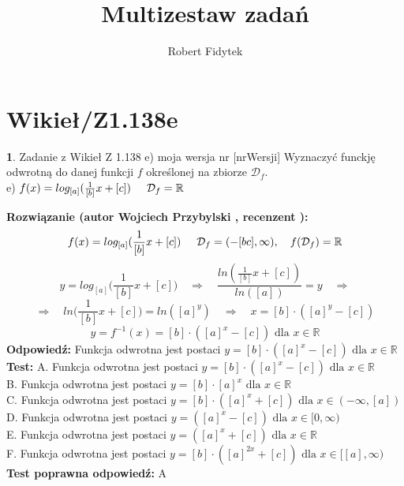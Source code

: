 \documentclass[12pt, a4paper]{article}
\title{Multizestaw zadań}
\author{Robert Fidytek}
\date{}
\theoremstyle{definition} %
\newtheorem{zad}{}
\newcommand{\kategoria}[1]{\section{#1}} %
\newcommand{\zadStart}[1]{\begin{zad}#1\newline} %
\newcommand{\zadStop}{\end{zad}}   %
\newcommand{\rozwStart}[2]{\noindent \textbf{Rozwiązanie (autor #1 , recenzent #2): }\newline} %
\newcommand{\rozwStop}{\newline}                                            %
\newcommand{\odpStart}{\noindent \textbf{Odpowiedź:}\newline}    %
\newcommand{\odpStop}{\newline}                                             %
\newcommand{\testStart}{\noindent \textbf{Test:}\newline} %
\newcommand{\testStop}{\newline} %
\newcommand{\kluczStart}{\noindent \textbf{Test poprawna odpowiedź:}\newline} %
\newcommand{\kluczStop}{\newline} %
\begin{document}
\maketitle


\kategoria{Wikieł/Z1.138e}
\zadStart{Zadanie z Wikieł Z 1.138 e) moja wersja nr [nrWersji]}
Wyznaczyć funckję odwrotną do danej funkcji $f$ określonej na zbiorze $\mathcal{D}_{f}$.\\
e) $f(x)=log_{[a]}(\frac{1}{[b]}x+[c])\hspace{5mm}\mathcal{D}_{f}=\mathbb{R}$
\zadStop
\rozwStart{Wojciech Przybylski}{}
$$f(x)=log_{[a]}(\frac{1}{[b]}x+[c])\hspace{5mm} \mathcal{D}_{f}=(-[bc],\infty), \quad f(\mathcal{D}_{f})=\mathbb{R}$$
$$y=log_{[a]}\Big(\frac{1}{[b]}x+[c]\Big) \quad \Rightarrow \quad \frac{ln(\frac{1}{[b]}x+[c])}{ln([a])}=y \quad \Rightarrow $$
$$\Rightarrow \quad ln\Big(\frac{1}{[b]}x+[c]\Big)=ln([a]^{y}) \quad \Rightarrow \quad x=[b]\cdot([a]^{y}-[c])$$
$$y=f^{-1}(x)=[b]\cdot([a]^{x}-[c]) \mbox{ dla } x\in \mathbb{R}$$
\rozwStop
\odpStart
Funkcja odwrotna jest postaci $y=[b]\cdot([a]^{x}-[c]) \mbox{ dla }x\in \mathbb{R}$
\odpStop
\testStart
A. Funkcja odwrotna jest postaci $y=[b]\cdot([a]^{x}-[c])  \mbox{ dla }x\in\mathbb{R}$\\
B. Funkcja odwrotna jest postaci $y=[b]\cdot[a]^{x} \mbox{ dla }x\in\mathbb{R}$\\
C. Funkcja odwrotna jest postaci $y=[b]\cdot([a]^{x}+[c])  \mbox{ dla }x\in(-\infty,[a])$\\
D. Funkcja odwrotna jest postaci $y=([a]^{x}-[c]) \mbox{ dla }x\in[0,\infty)$\\
E. Funkcja odwrotna jest postaci $y=([a]^{x}+[c]) \mbox{ dla }x\in \mathbb{R}$\\
F. Funkcja odwrotna jest postaci $y=[b]\cdot([a]^{2x}+[c])\mbox{ dla }x\in[[a],\infty)$
\testStop
\kluczStart
A
\kluczStop
\end{document}
